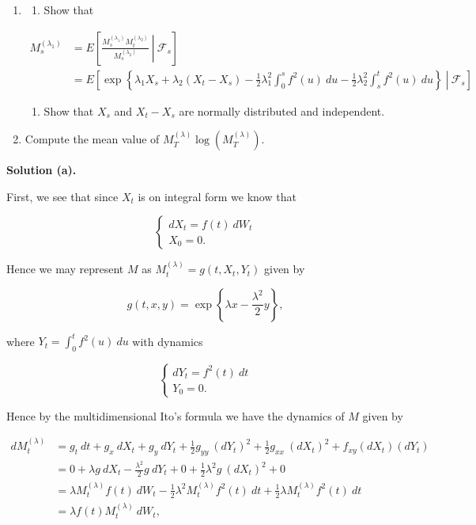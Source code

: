 \documentclass[
]{article}
\providecommand{\tightlist}{%
  \setlength{\itemsep}{0pt}\setlength{\parskip}{0pt}}
\begin{document}
\begin{enumerate}
\def\labelenumi{\alph{enumi}.}
\setcounter{enumi}{1}
\item
  \begin{enumerate}
  \def\labelenumii{\roman{enumii}.}
  \tightlist
  \item
    Show that
  \end{enumerate}

  \begin{align*}
  M^{(\lambda_1)}_s&=E\left[\left.\frac{M^{(\lambda_1)}_sM^{(\lambda_2)}_t}{M^{(\lambda_2)}_s} \ \right\vert\ \mathcal{F}_s\right]\\
  &=E\left[\left.\exp\left\{\lambda_1X_s+\lambda_2(X_t-X_s)-\frac{1}{2}\lambda_1^2\int_0^sf^2(u)\ du- \frac{1}{2}\lambda_2^2\int_s^tf^2(u)\ du\right\} \ \right\vert\ \mathcal{F}_s\right]
  \end{align*}

  \begin{enumerate}
  \def\labelenumii{\roman{enumii}.}
  \setcounter{enumii}{1}
  \tightlist
  \item
    Show that \(X_s\) and \(X_t-X_s\) are normally distributed and
    independent.
  \end{enumerate}
\item
  Compute the mean value of \(M^{(\lambda)}_T\log(M^{(\lambda)}_T)\).
\end{enumerate}

\textbf{Solution (a).}

First, we see that since \(X_t\) is on integral form we know that

\[
\begin{cases}
dX_t=f(t)\ dW_t\\
X_0=0.
\end{cases}
\]

Hence we may represent \(M\) as \(M^{(\lambda)}_t=g(t,X_t,Y_t)\) given
by

\[
g(t,x,y)=\exp\left\{\lambda x-\frac{\lambda^2}{2}y \right\},
\]

where \(Y_t=\int_0^t f^2(u)\ du\) with dynamics

\[
\begin{cases}
dY_t=f^2(t)\ dt\\
Y_0=0.
\end{cases}
\]

Hence by the multidimensional Ito's formula we have the dynamics of
\(M\) given by

\begin{align*}
dM^{(\lambda)}_t&=g_t\ dt+g_x\ dX_t+g_y\ dY_t+\frac{1}{2}g_{yy}\ (dY_t)^2+\frac{1}{2}g_{xx}\ (dX_t)^2 +f_{xy}(dX_t)(dY_t)\\
&=0+\lambda g\ dX_t-\frac{\lambda^2}{2}g\ dY_t+0+\frac{1}{2}\lambda ^2g\ (dX_t)^2+0\\
&=\lambda M_t^{(\lambda)} f(t)\ dW_t-\frac{1}{2}\lambda^2M_t^{(\lambda)} f^2(t)\ dt+\frac{1}{2}\lambda M_t^{(\lambda)} f^2(t)\ dt\\
&=\lambda f(t)M_t^{(\lambda)}\ dW_t,
\end{align*}
\end{document}
